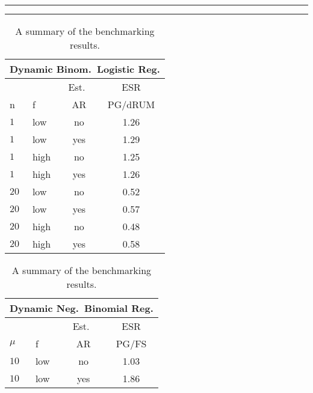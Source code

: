 \documentclass[12pt]{article}
\begin{document}
\begin{table}

\begin{center}
\caption{\label{tab:benchmark-summary} A summary of the benchmarking results.}
\hrule
\vspace{2pt}
\hrule
\end{center}
\begin{center}
\small
\begin{tabular}{l l c c}
\multicolumn{4}{c}{Dynamic Binom.\ Logistic Reg.} \\
\hline
& & Est.\ & ESR \\
n & f & AR & PG/dRUM \\
\hline
$1$ & low & no & 1.26 \\
$1$ & low & yes & 1.29 \\

$1$ & high & no & 1.25 \\
$1$ & high & yes & 1.26 \\

$20$ & low & no & 0.52 \\
$20$ & low & yes & 0.57 \\

$20$ & high & no & 0.48 \\
$20$ & high & yes & 0.58 
\end{tabular}
%
\hspace{12pt}
%
\begin{tabular}{l l c c}
\multicolumn{4}{c}{Dynamic Neg.\ Binomial Reg.} \\
\hline
& & Est.\ & ESR \\
$\mu$ & f & AR & PG/FS \\
\hline
$10$ & low & no & 1.03 \\
$10$ & low & yes & 1.86 \\


\end{tabular}
\end{center}
\end{table}
\end{document}
